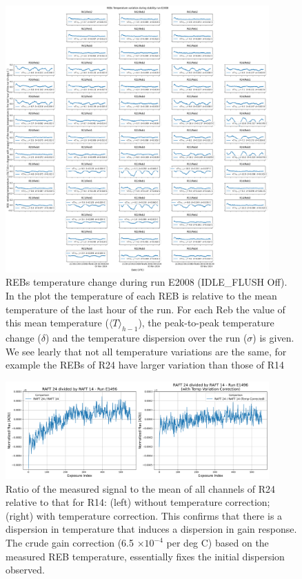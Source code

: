 \begin{figure}[ht]
\begin{centering}
\includegraphics[width=0.9\textwidth]{figures/FocalPlanTempRun_E2008.png}
\end{centering}
\caption{REBs temperature change during run E2008 (IDLE\_FLUSH Off). In the plot the temperature of each REB is relative to the mean temperature of the last hour of the run. For each Reb the value of this mean temperature ($\langle T \rangle_{h-1}$), the peak-to-peak temperature change ($\delta$) and the temperature dispersion over the run ($\sigma$) is given. We see learly that not all temperature variations are the same, for example the REBs of R24 have larger variation than those of R14}
\label{fig:tempE2008}
\end{figure}
\begin{figure}[ht] %
\begin{centering}
\includegraphics[width=0.9\textwidth]{figures/raft24div14.png}
\end{centering}
\caption{Ratio of the measured signal to the mean of all channels of R24 relative to that for R14:  (left) without temperature correction; (right) with temperature correction. This confirms that there is a  dispersion in temperature that induces a dispersion in gain response. The crude gain correction (6.5 $\times 10^{-4}$ per deg C) based on the measured REB temperature, essentially fixes the initial dispersion observed.   }
\label{fig:R24divR14}
\end{figure}



